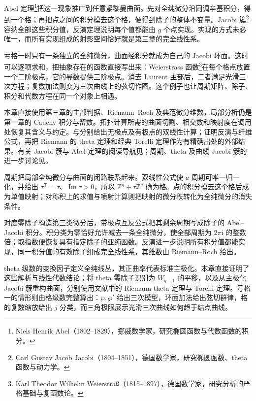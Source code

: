 \ProseParagraphBreak

Abel 定理\footnote{Niels Henrik Abel（1802--1829），挪威数学家，研究椭圆函数与代数函数的积分。}把这一现象推广到任意紧黎曼曲面。先对全纯微分沿同调辛基积分，得到一个格；再把点之间的积分模去这个格，便得到除子的整体不变量。Jacobi 簇\footnote{Carl Gustav Jacob Jacobi（1804--1851），德国数学家，研究椭圆函数、theta 函数与动力学。}容纳全部这些积分值，反演定理说明每个值都能由 \(g\) 个点实现。实现的方式未必唯一，而所有实现组成的射影空间恰好就是第三章的完全线性系。

\ProseParagraphBreak

亏格一时只有一条独立的全纯微分，曲面经积分就成为自己的 Jacobi 环面。这时可以逐项求和，把抽象存在的函数直接写出来：Weierstrass 函数\footnote{Karl Theodor Wilhelm Weierstraß（1815--1897），德国数学家，研究分析的严格基础与复函数论。}在每个格点放置一个二阶极点，它的导数提供三阶极点。消去 Laurent 主部后，二者满足光滑三次方程；复数加法则变为三次曲线上的弦切作图。这个例子也让周期矩阵、除子、积分和代数方程在同一个对象上相遇。

\ProseParagraphBreak

本章直接使用第三章的主部判据、Riemann--Roch 及典范微分维数，局部分析仍是第一章的 Cauchy 积分与留数。拓扑计算所需的曲面切割、相交数和映射度在调用处恢复其含义与约定。与分别给出无极点及有极点的双线性计算；证明反演与纤维公式，再把 Riemann 的 theta 定理和经典 Torelli 定理作为有精确出处的外部结果。有关 Jacobi 簇与 Abel 定理的阅读导航见\parencite[第20--21节]{Forster1981}；周期、theta 及曲线 Jacobi 簇的进一步讨论见\parencite[第2章第6--7节]{GriffithsHarris1994}。







\begin{chaptersummary}
	周期把局部全纯微分与曲面的闭路联系起来。双线性公式使 \(a\) 周期可唯一归一化，并给出 \(\tau^{\mathsf T}=\tau\)、\(\operatorname{Im}\tau>0\)，所以 \(\mathbb Z^g+\tau\mathbb Z^g\) 确为格。点的积分模去这个格后成为单值映射；对称积上的求值与喷射计算则把映射的微分秩转化为全纯微分的消失条件。

	\ProseParagraphBreak

	对度零除子构造第三类微分后，带极点互反公式把其剩余周期写成除子的 Abel--Jacobi 积分。积分类为零恰好允许减去一条全纯微分，使全部周期为 \(2\pi\mathrm{i}\) 的整数倍；取指数便恢复具有指定除子的亚纯函数。反演进一步说明所有积分值都能实现，同一积分值的有效除子组成完全线性系，其维数由 Riemann--Roch 给出。

	\ProseParagraphBreak

	theta 级数的变换因子定义全纯线丛，其正曲率代表标准主极化。本章直接证明了这些解析与线性代数结论；将 theta 零除子识别为 \(W_{g-1}\) 的平移，以及从主极化 Jacobi 簇重构曲面，分别使用文献中的 Riemann theta 定理与 Torelli 定理。亏格一的情形则由格级数完整算出：\(\wp,\wp'\) 给出三次模型，环面加法给出弦切群律，格的复数缩放给出 \(j\) 分类，而三角极限展示光滑三次曲线如何趋于结点曲线。
\end{chaptersummary}

